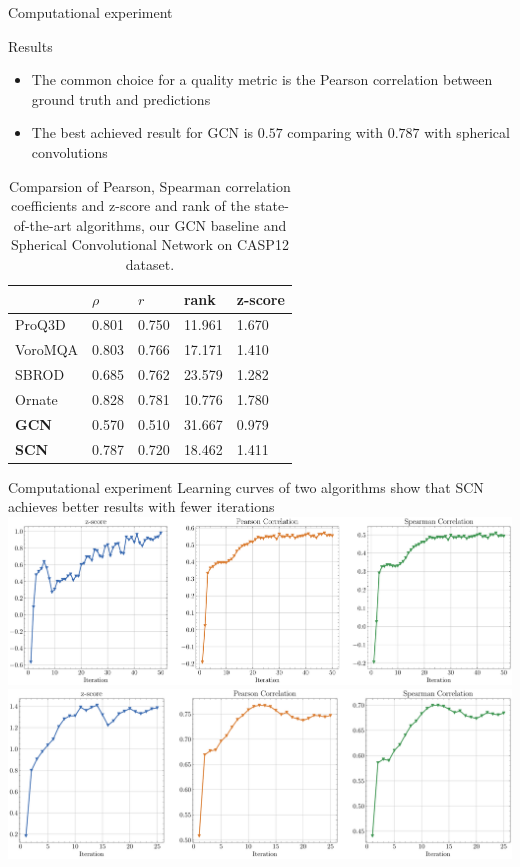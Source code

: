 \documentclass{beamer}
\begin{document}
\begin{frame}{Computational experiment}
    \begin{block}{Results}
        \begin{itemize}
            \item The common choice for a quality metric is the Pearson correlation between ground truth and predictions
            \item The best achieved result for GCN is $0.57$ comparing with $0.787$ with spherical convolutions
        \end{itemize}
    \end{block}
    \begin{table}[H]
        \centering
        \begin{tabular}{l|l|l|l|l}
            \hline
                   & $\rho$ &  $r$     &   rank       & z-score \\ \hline
        ProQ3D     & 0.801  &  0.750   &   11.961     & 1.670       \\
        VoroMQA    & 0.803  &  0.766   &   17.171     & 1.410       \\  
        SBROD      & 0.685  &  0.762   &   23.579     & 1.282       \\
        Ornate     & 0.828  &  0.781   &   10.776     & 1.780       \\
        \textbf{GCN}        & 0.570  &  0.510   &   31.667     & 0.979       \\
        \textbf{SCN}        & 0.787  &  0.720   &   18.462     & 1.411       
    \end{tabular}
    \caption{Comparsion of Pearson, Spearman correlation coefficients and z-score and rank of the state-of-the-art algorithms,
        our GCN baseline and Spherical Convolutional Network on CASP12 dataset.
        }
    \label{Tab:1}
    \end{table}
    
\end{frame}
\begin{frame}{Computational experiment}
    Learning curves of two algorithms show that SCN achieves better results with fewer iterations
    \includegraphics[width=1.0\textwidth]{img/z_score_casp12.pdf}
    \includegraphics[width=1.0\textwidth]{img/z_score_casp12_sh.pdf}
\end{frame}
\end{document}
